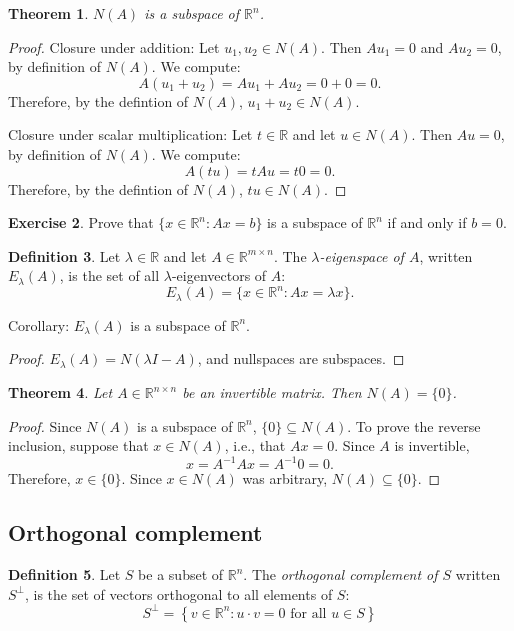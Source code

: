 \documentclass{amsart}
\newcommand{\RR}{\mathbb{R}}
\newtheorem{theorem}{Theorem}[section]
\theoremstyle{definition}
\newtheorem{definition}[theorem]{Definition}
\newtheorem{exercise}[theorem]{Exercise}
\begin{document}
\begin{theorem}
  $N(A)$ is a subspace of $\RR^n$.
\end{theorem}

\begin{proof}
  Closure under addition: Let $u_1, u_2\in N(A)$. Then $Au_1=0$ and $Au_2=0$, by definition of $N(A)$. We compute:
  \[
    A(u_1+u_2)=Au_1 + Au_2 = 0 + 0 = 0.
  \]
  Therefore, by the defintion of $N(A)$, $u_1+u_2\in N(A)$.

  Closure under scalar multiplication: Let $t\in \RR$ and let $u\in N(A)$.
  Then $Au=0$, by definition of $N(A)$. We compute:
  \[
    A(tu)=tAu  = t0 = 0.
  \]
  Therefore, by the defintion of $N(A)$, $tu\in N(A)$.
\end{proof}

\begin{exercise}
Prove that $\{x\in\RR^n : Ax=b\}$ is a subspace of $\RR^n$ if and only if $b=0$.
\end{exercise}

\begin{definition}
  Let $\lambda\in \RR$ and let $A\in\RR^{m\times n}$.
  The \emph{$\lambda$-eigenspace of $A$}, written  $E_\lambda(A)$, is the set of all $\lambda$-eigenvectors of $A$:
  $$E_\lambda(A) = \{x\in\RR^n: Ax = \lambda x\}.$$
\end{definition}

Corollary: $E_\lambda(A)$ is a subspace of $\RR^n$.

\begin{proof}
  $E_\lambda(A) = N(\lambda I - A)$, and nullspaces are subspaces.
\end{proof}

\begin{theorem}\label{theorem:invertible_implies_zero_nullspace}
Let $A\in\RR^{n\times n}$ be an invertible matrix. Then $N(A)=\{0\}$.
\end{theorem}

\begin{proof}
Since $N(A)$ is a subspace of $\RR^n$, $\{0\}\subseteq N(A)$.
To prove the reverse inclusion, suppose that $x\in N(A)$, i.e., that $Ax=0$.
Since $A$ is invertible,
\[
x = A^{-1}Ax = A^{-1}0=0.
\]
Therefore, $x\in \{0\}$.
Since $x\in N(A)$ was arbitrary, $N(A)\subseteq \{0\}$.
\end{proof}

\subsection{Orthogonal complement}
\begin{definition}
  Let $S$ be a subset of $\RR^n$.
The \emph{orthogonal complement of $S$} written $S^\perp$, is the set of vectors orthogonal to all elements of $S$:
$$S^\perp = \left\{v\in\RR^n : \text{$u\cdot v = 0$ for all $u\in S$}
\right\}$$
\end{definition}
\end{document}
